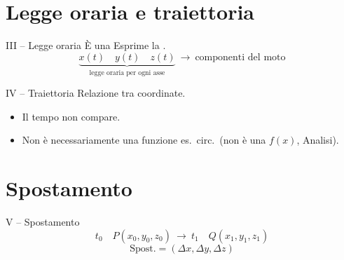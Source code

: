\documentclass[11pt,a4paper,openany]{report}
\begin{document}
\section{Legge oraria e traiettoria}
\begin{definizione}{III -- Legge oraria}
È una 
\implica Esprime la .
\[
  \underbrace{x(t) \quad y(t) \quad z(t)}_{\text{legge oraria per ogni asse}}
  \ \longrightarrow\ \text{componenti del moto}
\]
\end{definizione}

\begin{definizione}{IV -- Traiettoria}
\implica Relazione tra coordinate.
\end{definizione}

\begin{nota}
\begin{itemize}[nosep]
  \item Il tempo non compare.
  \item Non è necessariamente una funzione \implica es.\ circ.\ (non è una $f(x)$, Analisi).
\end{itemize}
\end{nota}

\section{Spostamento}
\begin{definizione}{V -- Spostamento}
\[
  t_0 \quad P(x_0, y_0, z_0) \ \longrightarrow\ t_1 \quad Q(x_1, y_1, z_1)
\]
\[
  \text{Spost.} = (\Delta x, \Delta y, \Delta z)
\]
\end{definizione}
\end{document}
